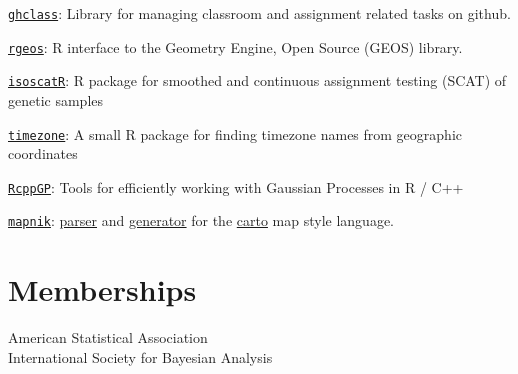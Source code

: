 \documentclass[margin,line]{res}
\begin{document}
\begin{resume}
\href{https://github.com/rundel/ghclass}{\texttt{ghclass}}: Library for managing classroom and assignment related tasks on github.

\href{https://github.com/rundel/rgeos}{\texttt{rgeos}}: R interface to the Geometry Engine, Open Source (GEOS) library.

\vspace{-0.15cm}
\href{https://github.com/rundel/isoscatR}{\texttt{isoscatR}}: R package for smoothed and continuous assignment testing (SCAT) of genetic samples

\vspace{-0.15cm}
\href{https://github.com/rundel/timezone}{\texttt{timezone}}: A small R package for finding timezone names from geographic coordinates

\vspace{-0.15cm}
\href{https://github.com/rundel/RcppGP}{\texttt{RcppGP}}: Tools for efficiently working with Gaussian Processes in R / C++

\vspace{-0.15cm}
\href{http://mapnik.org}{\texttt{mapnik}}: \href{https://github.com/rundel/carto-parser}{parser} and \href{https://github.com/rundel/carto-generator}{generator} for the \href{https://github.com/mapbox/carto}{carto} map style language.

\vspace{4mm}

\section{\sc Memberships}
American Statistical Association \\
International Society for Bayesian Analysis

\end{resume}
\end{document}
